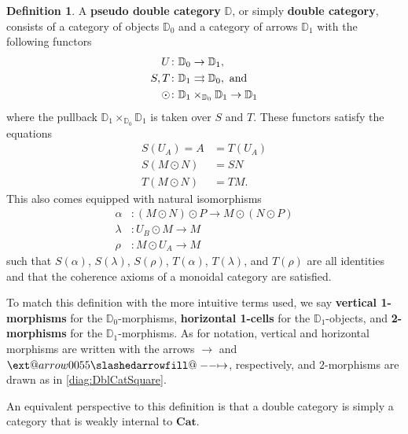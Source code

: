 \documentclass[11pt]{amsart}
\makeatletter
\newcommand{\cat}[1]{\mathbf{#1}}
\newcommand{\dblcat}[1]{\mathbb{#1}}
\renewcommand{\t}[1]{\textup{#1}}
\newcommand{\from}{\colon}
\def\slashedarrowfill@#1#2#3#4#5{%
	$\m@th\thickmuskip0mu\medmuskip\thickmuskip\thinmuskip\thickmuskip
	\relax#5#1\mkern-7mu%
	\cleaders\hbox{$#5\mkern-2mu#2\mkern-2mu$}\hfill
	\mathclap{#3}\mathclap{#2}%
	\cleaders\hbox{$#5\mkern-2mu#2\mkern-2mu$}\hfill
	\mkern-7mu#4$%
}
\def\rightslashedarrowfill@{%
	\slashedarrowfill@\relbar\relbar\mapstochar\rightarrow}
\newcommand{\xslashedrightarrow}[2][]{%
	\ext@arrow 0055{\rightslashedarrowfill@}{#1}{#2}}
\newcommand{\hto}{\xslashedrightarrow{}}
\theoremstyle{remark}
\theoremstyle{definition}
\newtheorem{defn}[thm]{Definition}
\makeatother
\begin{document}
%
\begin{defn}
	\label{def:DoubleCategory}
	A \textbf{pseudo double category} $\dblcat{D}$, or simply \textbf{double category}, consists of a category of objects $\dblcat{D}_{0}$ and a category of arrows $\dblcat{D}_{1}$ with the following functors
	\begin{equation*}
	\begin{split}
	U & \from \dblcat{D}_{0} \to \dblcat{D}_{1}, \\
	S,T & \from \dblcat{D}_{1} \rightrightarrows \dblcat{D}_{0}, \t{ and} \\
	\odot & \from \dblcat{D}_{1} \times_{\dblcat{D}_{0}} \dblcat{D}_{1} \to \dblcat{D}_{1}
	\end{split}
	\end{equation*}
	where the pullback $\dblcat{D}_{1} \times_{\dblcat{D}_{0}} \dblcat{D}_{1}$ is taken over $S$ and $T$.  These functors satisfy the equations
	\begin{equation*}
	\begin{split}
	S(U_{A}) = A &= T(U_{A}) \\
	S(M \odot N) & = SN \\
	T(M \odot N) & = TM. 
	\end{split}
	\end{equation*}
	This also comes equipped with natural isomorphisms
	\begin{equation*}
	\begin{split}
	\alpha & \from (M \odot N) \odot P \to M \odot (N \odot P)\\
	\lambda & \from U_{B} \odot M \to M\\
	\rho & \from M \odot U_{A} \to M
	\end{split}
	\end{equation*}
	such that $S(\alpha)$, $S(\lambda)$, $S(\rho)$, $T(\alpha)$, $T(\lambda)$, and $T(\rho)$ are all identities and that the coherence axioms of a monoidal category are satisfied. 
	
	To match this definition with the more intuitive terms used, we say \textbf{vertical 1-morphisms} for the $\dblcat{D}_{0}$-morphisms, \textbf{horizontal 1-cells} for the $\dblcat{D}_{1}$-objects, and \textbf{2-morphisms} for the $\dblcat{D}_{1}$-morphisms. As for notation, vertical and horizontal morphisms are written with the arrows $\to$ and $\hto$, respectively, and $2$-morphisms are drawn as in \eqref{diag:DblCatSquare}.
\end{defn}

An equivalent perspective to this definition is that a double category is simply a category that is weakly internal to $\cat{Cat}$. 
\end{document}
